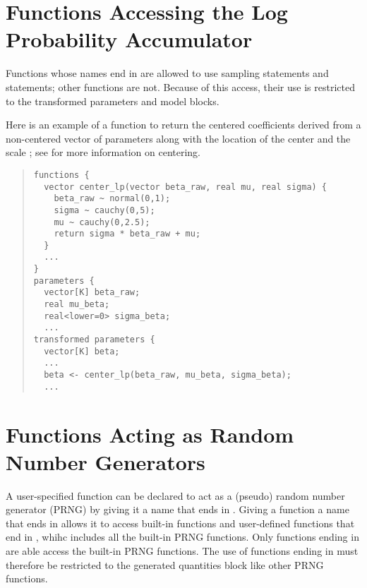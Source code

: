 \section{Functions Accessing the Log Probability  Accumulator}

Functions whose names end in  are allowed to use sampling
statements and  statements; other
functions are not.  Because of this access, their use is restricted to
the transformed parameters and model blocks.

Here is an example of a function to return the centered coefficients
derived from a non-centered vector of parameters 
along with the location  of the center and the scale
; see  for more information
on centering.
%
\begin{quote}
\begin{Verbatim}
functions {
  vector center_lp(vector beta_raw, real mu, real sigma) {
    beta_raw ~ normal(0,1);
    sigma ~ cauchy(0,5);
    mu ~ cauchy(0,2.5);
    return sigma * beta_raw + mu;
  }
  ...
}
parameters {
  vector[K] beta_raw;
  real mu_beta;
  real<lower=0> sigma_beta;
  ...
transformed parameters {
  vector[K] beta;
  ...
  beta <- center_lp(beta_raw, mu_beta, sigma_beta);
  ...
\end{Verbatim}
\end{quote}


\section{Functions Acting as Random Number Generators}

A user-specified function can be declared to act as a (pseudo) random
number generator (PRNG) by giving it a name that ends in .
Giving a function a name that ends in  allows it to access
built-in functions and user-defined functions that end in
, whihc includes all the built-in PRNG functions.  Only
functions ending in  are able access the built-in PRNG
functions.  The use of functions ending in  must therefore
be restricted to the generated quantities block like other PRNG
functions.

